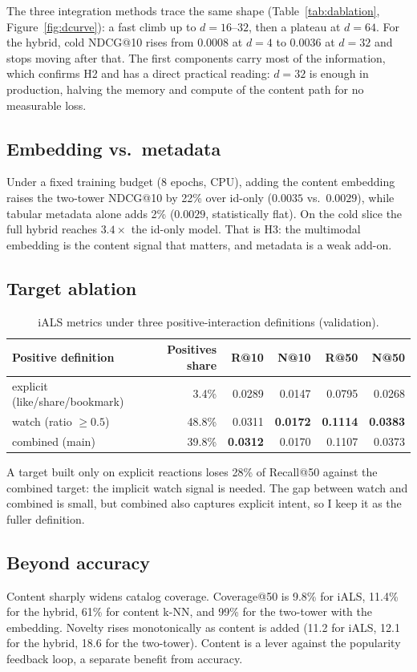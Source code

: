 \documentclass[11pt,a4paper]{article}
\newcommand{\best}[1]{\textbf{#1}}
\begin{document}
The three integration methods trace the same shape (Table~\ref{tab:dablation},
Figure~\ref{fig:dcurve}): a fast climb up to $d=16$--$32$, then a plateau at $d=64$. For
the hybrid, cold NDCG@10 rises from $0.0008$ at $d=4$ to $0.0036$ at $d=32$ and stops
moving after that. The first components carry most of the information, which confirms H2
and has a direct practical reading: $d=32$ is enough in production, halving the memory
and compute of the content path for no measurable loss.

\subsection{Embedding vs.\ metadata}
Under a fixed training budget (8 epochs, CPU), adding the content embedding raises the
two-tower NDCG@10 by 22\% over id-only ($0.0035$ vs.\ $0.0029$), while tabular metadata
alone adds 2\% ($0.0029$, statistically flat). On the cold slice the full hybrid reaches
$3.4\times$ the id-only model. That is H3: the multimodal embedding is the content signal
that matters, and metadata is a weak add-on.

\subsection{Target ablation}
\label{sec:target}
\begin{table}[H]
\centering
\small
\caption{iALS metrics under three positive-interaction definitions (validation).}
\label{tab:target}
\begin{tabular}{lrrrrr}
\toprule
Positive definition & Positives share & R@10 & N@10 & R@50 & N@50 \\
\midrule
explicit (like/share/bookmark) & 3.4\%  & 0.0289 & 0.0147 & 0.0795 & 0.0268 \\
watch (ratio $\geq 0.5$)       & 48.8\% & 0.0311 & \best{0.0172} & \best{0.1114} & \best{0.0383} \\
combined (main)                & 39.8\% & \best{0.0312} & 0.0170 & 0.1107 & 0.0373 \\
\bottomrule
\end{tabular}
\end{table}

A target built only on explicit reactions loses 28\% of Recall@50 against the combined
target: the implicit watch signal is needed. The gap between watch and combined is small,
but combined also captures explicit intent, so I keep it as the fuller definition.

\subsection{Beyond accuracy}
Content sharply widens catalog coverage. Coverage@50 is 9.8\% for iALS, 11.4\% for the
hybrid, 61\% for content k-NN, and 99\% for the two-tower with the embedding. Novelty
rises monotonically as content is added (11.2 for iALS, 12.1 for the hybrid, 18.6 for the
two-tower). Content is a lever against the popularity feedback loop, a separate benefit
from accuracy.
\end{document}
